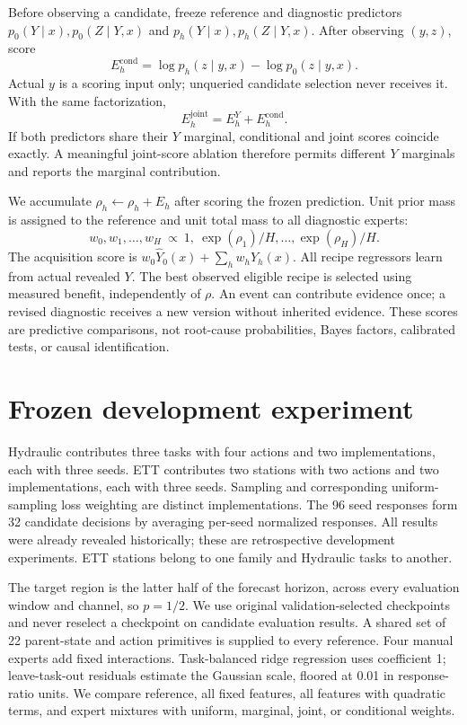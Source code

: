 \documentclass[10pt]{article}
\begin{document}
Before observing a candidate, freeze reference and diagnostic predictors
$p_0(Y\mid x),p_0(Z\mid Y,x)$ and $p_h(Y\mid x),p_h(Z\mid Y,x)$.
After observing $(y,z)$, score
\[
 E_h^{\mathrm{cond}}=\log p_h(z\mid y,x)-\log p_0(z\mid y,x).
\]
Actual $y$ is a scoring input only; unqueried candidate selection never receives it.
With the same factorization,
\[
 E_h^{\mathrm{joint}}=E_h^Y+E_h^{\mathrm{cond}}.
\]
If both predictors share their $Y$ marginal, conditional and joint scores coincide exactly.
A meaningful joint-score ablation therefore permits different $Y$ marginals and reports the marginal contribution.

We accumulate $\rho_h\leftarrow\rho_h+E_h$ after scoring the frozen prediction.
Unit prior mass is assigned to the reference and unit total mass to all diagnostic experts:
\[
 w_0,w_1,\ldots,w_H\ \propto\
 1,\ \exp(\rho_1)/H,\ldots,\exp(\rho_H)/H.
\]
The acquisition score is $w_0\hat Y_0(x)+\sum_h w_h\hat Y_h(x)$.
All recipe regressors learn from actual revealed $Y$.
The best observed eligible recipe is selected using measured benefit, independently of $\rho$.
An event can contribute evidence once; a revised diagnostic receives a new version without inherited evidence.
These scores are predictive comparisons, not root-cause probabilities, Bayes factors, calibrated tests, or causal identification.

\section{Frozen development experiment}
Hydraulic contributes three tasks with four actions and two implementations, each with three seeds.
ETT contributes two stations with two actions and two implementations, each with three seeds.
Sampling and corresponding uniform-sampling loss weighting are distinct implementations.
The 96 seed responses form 32 candidate decisions by averaging per-seed normalized responses.
All results were already revealed historically; these are retrospective development experiments.
ETT stations belong to one family and Hydraulic tasks to another.

The target region is the latter half of the forecast horizon, across every evaluation window and channel, so $p=1/2$.
We use original validation-selected checkpoints and never reselect a checkpoint on candidate evaluation results.
A shared set of 22 parent-state and action primitives is supplied to every reference.
Four manual experts add fixed interactions.
Task-balanced ridge regression uses coefficient 1; leave-task-out residuals estimate the Gaussian scale, floored at 0.01 in response-ratio units.
We compare reference, all fixed features, all features with quadratic terms, and expert mixtures with uniform, marginal, joint, or conditional weights.
\end{document}
